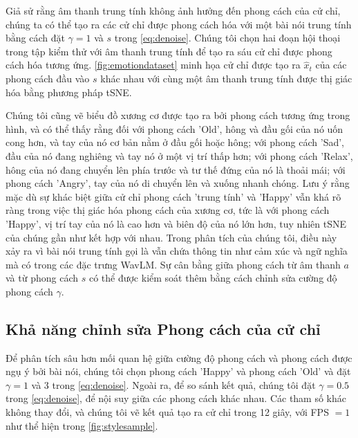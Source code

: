 Giả sử rằng âm thanh trung tính không ảnh hưởng đến phong cách của cử chỉ, chúng ta có thể tạo ra các cử chỉ được phong cách hóa với một bài nói trung tính bằng cách đặt $\gamma=1$ và $s$ trong \autoref{eq:denoise}. Chúng tôi chọn hai đoạn hội thoại trong tập kiểm thử với âm thanh trung tính để tạo ra sáu cử chỉ được phong cách hóa tương ứng. \autoref{fig:emotiondataset} minh họa cử chỉ được tạo ra $\hat{x}_{t}$ của các phong cách đầu vào $s$ khác nhau với cùng một âm thanh trung tính được thị giác hóa bằng phương pháp tSNE.


Chúng tôi cũng vẽ biểu đồ xương cơ được tạo ra bởi phong cách tương ứng trong hình, và có thể thấy rằng đối với phong cách 'Old', hông và đầu gối của nó uốn cong hơn, và tay của nó cơ bản nằm ở đầu gối hoặc hông; với phong cách 'Sad', đầu của nó đang nghiêng và tay nó ở một vị trí thấp hơn; với phong cách 'Relax', hông của nó đang chuyển lên phía trước và tư thế đứng của nó là thoải mái; với phong cách 'Angry', tay của nó di chuyển lên và xuống nhanh chóng. Lưu ý rằng mặc dù sự khác biệt giữa cử chỉ phong cách 'trung tính' và 'Happy' vẫn khá rõ ràng trong việc thị giác hóa phong cách của xương cơ, tức là với phong cách 'Happy', vị trí tay của nó là cao hơn và biên độ của nó lớn hơn, tuy nhiên tSNE của chúng gần như kết hợp với nhau. Trong phân tích của chúng tôi, điều này xảy ra vì bài nói trung tính gọi là vẫn chứa thông tin như cảm xúc và ngữ nghĩa mà có trong các đặc trưng WavLM. Sự cân bằng giữa phong cách từ âm thanh $a$ và từ phong cách $s$ có thể được kiểm soát thêm bằng cách chỉnh sửa cường độ phong cách $\gamma$.

\subsection{Khả năng chỉnh sửa Phong cách của cử chỉ}

Để phân tích sâu hơn mối quan hệ giữa cường độ phong cách và phong cách được ngụ ý bởi bài nói, chúng tôi chọn phong cách 'Happy' và phong cách 'Old' và đặt $\gamma=1$ và 3 trong \autoref{eq:denoise}. Ngoài ra, để so sánh kết quả, chúng tôi đặt $\gamma=0.5$ trong \autoref{eq:denoise}, để nội suy giữa các phong cách khác nhau. Các tham số khác không thay đổi, và chúng tôi vẽ kết quả tạo ra cử chỉ trong 12 giây, với FPS $=1$ như thể hiện trong \autoref{fig:stylesample}.


